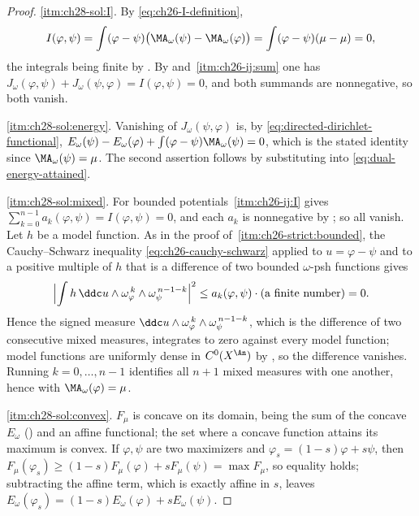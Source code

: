 \begin{proof}
\cref{itm:ch28-sol:I}.  By \eqref{eq:ch26-I-definition},
\[
 I(\varphi,\psi)=\int(\varphi-\psi)
   \bigl(\MA_\omega(\psi)-\MA_\omega(\varphi)\bigr)
 =\int(\varphi-\psi)(\mu-\mu)=0 ,
\]
the integrals being finite by .  By
 and
\,\cref{itm:ch26-ij:sum} one has
$J_\omega(\varphi,\psi)+J_\omega(\psi,\varphi)=I(\varphi,\psi)=0$, and
both summands are nonnegative, so both vanish.

\cref{itm:ch28-sol:energy}.  Vanishing of $J_\omega(\psi,\varphi)$ is,
by \eqref{eq:directed-dirichlet-functional},
$E_\omega(\psi)-E_\omega(\varphi)+\int(\varphi-\psi)\MA_\omega(\psi)=0$,
which is the stated identity since $\MA_\omega(\psi)=\mu$.  The second
assertion follows by substituting into \eqref{eq:dual-energy-attained}.

\cref{itm:ch28-sol:mixed}.  For bounded potentials
\,\cref{itm:ch26-ij:I} gives
$\sum_{k=0}^{n-1}a_k(\varphi,\psi)=I(\varphi,\psi)=0$, and each $a_k$ is
nonnegative by ; so all vanish.  Let
$h$ be a model function.  As in the proof of
\,\cref{itm:ch26-strict:bounded}, the
Cauchy--Schwarz inequality \eqref{eq:ch26-cauchy-schwarz} applied to
$u=\varphi-\psi$ and to a positive multiple of $h$ that is a difference
of two bounded $\omega$-psh functions gives
\[
 \Bigl|\int h\,\ddc u\wedge
   \omega_\varphi^{\,k}\wedge\omega_\psi^{\,n-1-k}\Bigr|^2
 \leq a_k(\varphi,\psi)\cdot(\text{a finite number})=0 .
\]
Hence the signed measure
$\ddc u\wedge\omega_\varphi^{\,k}\wedge\omega_\psi^{\,n-1-k}$, which is
the difference of two consecutive mixed measures, integrates to zero against
every model function; model functions are uniformly dense in
$C^0(X^{\An})$ by , so the difference vanishes.
Running $k=0,\ldots,n-1$ identifies all $n+1$ mixed measures with one
another, hence with $\MA_\omega(\varphi)=\mu$.

\cref{itm:ch28-sol:convex}.  $F_\mu$ is concave on its domain, being the
sum of the concave $E_\omega$ () and an
affine functional; the set where a concave function attains its maximum is
convex.  If $\varphi,\psi$ are two maximizers and
$\varphi_s=(1-s)\varphi+s\psi$, then
$F_\mu(\varphi_s)\geq(1-s)F_\mu(\varphi)+sF_\mu(\psi)=\max F_\mu$, so
equality holds; subtracting the affine term, which is exactly affine in
$s$, leaves
$E_\omega(\varphi_s)=(1-s)E_\omega(\varphi)+sE_\omega(\psi)$.


\end{proof}

